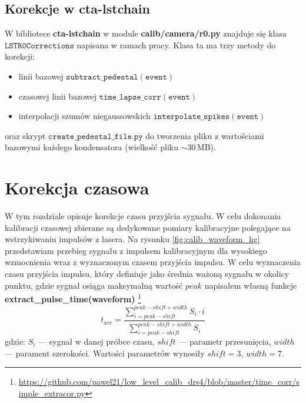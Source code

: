 \documentclass[a4paper,11pt,twoside]{article}
\begin{document}
\subsection{Korekcje w cta-lstchain}
W bibliotece {\bf{cta-lstchain}} w module {\bf{calib/camera/r0.py}} znajduje się klasa $\mathtt{LSTR0Corrections}$ napisana w ramach pracy. Klasa ta ma trzy metody do korekcji:
\begin{itemize}
\item linii bazowej $\mathtt{subtract\_pedestal(event)}$
\item czasowej linii bazowej $\mathtt{time\_lapse\_corr(event)}$
\item interpolacji szumów niegaussowskich $\mathtt{interpolate\_spikes(event)}$
\end{itemize}
oraz skrypt $\mathtt{create\_pedestal\_file.py}$ do tworzenia pliku z wartościami bazowymi każdego kondensatora (wielkość pliku $\sim$30\,MB).
\newpage
\section{Korekcja czasowa}
W tym rozdziale opisuje korekcje czasu przyjścia sygnału. 
W celu dokonania kalibracji czasowej zbierane są dedykowane pomiary kalibracyjne polegające na wstrzykiwaniu impulsów z lasera. Na rysunku \ref{fig:calib_waveform_hg} przedstawiam przebieg sygnału z impulsem kalibracyjnym dla wysokiego wzmocnienia wraz z wyznaczonym czasem przyjścia impulsu.
W celu wyznaczenia czasu przyjścia impulsu, który definiuje jako średnia ważoną sygnału w okolicy punktu, gdzie sygnał osiąga maksymalną wartość $peak$ napisałem własną funkcje {\bf{extract\_pulse\_time(waveform)}} \footnote{ \url{https://github.com/pawel21/low_level_calib_drs4/blob/master/time_corr/simple_extracor.py}}
\begin{equation}
t_{arr} = \frac{ \sum_{i=peak - shift}^{peak - shift + width} S_i \cdot i }{ \sum_{i=peak - shift}^{peak - shift + width} S_i}
\end{equation} 
gdzie: $S_i$ --- sygnał w danej próbce czasu, $shift$ --- parametr przesunięcia, $width$ --- parament szerokości. Wartości parametrów wynosiły $shift = 3$, $width = 7$. \\
\end{document}
